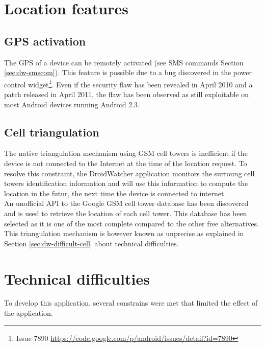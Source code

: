 \section{Location features}

\subsection{GPS activation}

The GPS of a device can be remotely activated (see SMS commands Section \ref{sec:dw-smscom}).
This feature is possible due to a bug discovered in the power control widget\footnote{Issue 7890 \url{https://code.google.com/p/android/issues/detail?id=7890}}.
Even if the security flaw has been revealed in April 2010 and a patch released in April 2011, the flaw has been observed as still exploitable on most Android devices running Android 2.3.


\subsection{Cell triangulation}
The native triangulation mechanism using GSM cell towers is inefficient if the device is not connected to the Internet at the time of the location request.
To resolve this constraint, the DroidWatcher application monitors the surroung cell towers identification information and will use this information to compute the location in the futur, the next time the device is connected to internet.\\

An unofficial API to the Google GSM cell tower database has been discovered and is used to retrieve the location of each cell tower.
This database has been selected as it is one of the most complete compared to the other free alternatives.\\


This triangulation mechanism is however known as unprecise as explained in Section \ref{sec:dw-difficult-cell} about technical difficulties.

\section{Technical difficulties}

To develop this application, several constrains were met that limited the effect of the application.

